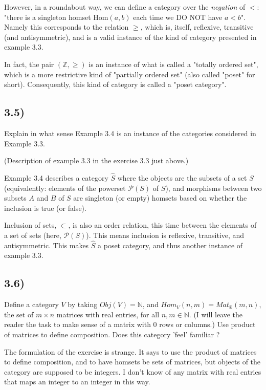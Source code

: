 However, in a roundabout way, we can define a category over the \textit{negation} of $<$: "there is a singleton homset $\text{Hom}(a,b)$ each time we DO NOT have $a < b$". Namely this corresponds to the relation $\ge$, which is, itself, reflexive, transitive (and antisymmetric), and is a valid instance of the kind of category presented in example 3.3.

In fact, the pair $(\mathbb{Z}, \geq)$ is an instance of what is called a "totally ordered set", which is a more restrictive kind of "partially ordered set" (also called "poset" for short). Consequently, this kind of category is called a "poset category".



\subsection*{3.5)}

Explain in what sense Example 3.4 is an instance of the categories considered in Example 3.3.

(Description of example 3.3 in the exercise 3.3 just above.)

Example 3.4 describes a category $\hat{S}$ where the objects are the subsets of a set $S$ (equivalently: elements of the powerset $\mathcal{P}(S)$ of $S$), and morphisms between two subsets $A$ and $B$ of $S$ are singleton (or empty) homsets based on whether the inclusion is true (or false).

Inclusion of sets, $\subset$, is also an order relation, this time between the elements of a set of sets (here, $\mathcal{P}(S)$). This means inclusion is reflexive, transitive, and antisymmetric. This makes $\hat{S}$ a poset category, and thus another instance of example 3.3. 



\subsection*{3.6)}

Define a category $V$ by taking $Obj(V) = \mathbb{N}$, and $Hom_V(n, m) = Mat_\mathbb{R}(m, n)$, the set of $m \times n$ matrices with real entries, for all $n, m \in \mathbb{N}$. (I will leave the reader the task to make sense of a matrix with 0 rows or columns.) Use product of matrices to define composition. Does this
category 'feel' familiar ?

The formulation of the exercise is strange. It says to use the product of matrices to define composition, and to have homsets be sets of matrices, but objects of the category are supposed to be integers. I don't know of any matrix with real entries that maps an integer to an integer in this way.

